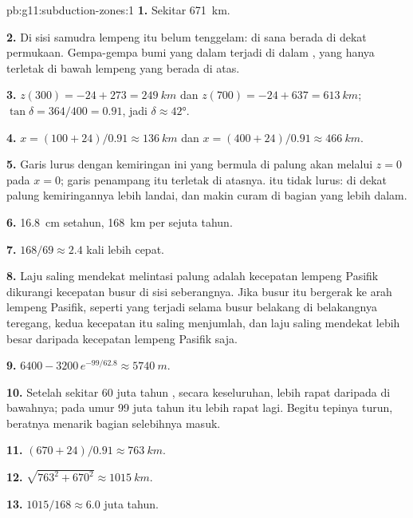 \begin{solution}{pb:g11:subduction-zones:1}
\textbf{1.} Sekitar \qty{671}{km}.

\textbf{2.} Di sisi samudra lempeng itu belum tenggelam:  di sana berada
di dekat permukaan. Gempa-gempa bumi yang dalam terjadi di dalam , yang
hanya terletak di bawah lempeng yang berada di atas.

\textbf{3.} $z(300) = -24 + 273 = \qty{249}{km}$ dan
$z(700) = -24 + 637 = \qty{613}{km}$; $\tan\delta = 364/400 = 0.91$, jadi
$\delta \approx \ang{42}$.

\textbf{4.} $x = (100 + 24)/0.91 \approx \qty{136}{km}$ dan
$x = (400 + 24)/0.91 \approx \qty{466}{km}$.

\textbf{5.} Garis lurus dengan kemiringan ini yang bermula di palung akan melalui
$z = 0$ pada $x = 0$; garis penampang itu terletak di atasnya.  itu
tidak lurus: di dekat palung kemiringannya lebih landai, dan makin curam di
bagian yang lebih dalam.

\textbf{6.} \qty{16.8}{cm} setahun, \qty{168}{km} per sejuta tahun.

\textbf{7.} $168/69 \approx 2.4$ kali lebih cepat.

\textbf{8.} Laju saling mendekat melintasi palung adalah kecepatan lempeng
Pasifik dikurangi kecepatan busur di sisi seberangnya. Jika busur itu bergerak ke
arah lempeng Pasifik, seperti yang terjadi selama busur belakang di belakangnya
teregang, kedua kecepatan itu saling menjumlah, dan laju saling mendekat lebih
besar daripada kecepatan lempeng Pasifik saja.

\textbf{9.} $6400 - 3200\,e^{-99/62.8} \approx \qty{5740}{m}$.

\textbf{10.} Setelah sekitar 60 juta tahun , secara keseluruhan,
lebih rapat daripada  di bawahnya; pada umur 99 juta tahun  itu
lebih rapat lagi. Begitu tepinya turun, beratnya menarik bagian selebihnya masuk.

\textbf{11.} $(670 + 24)/0.91 \approx \qty{763}{km}$.

\textbf{12.} $\sqrt{763^2 + 670^2} \approx \qty{1015}{km}$.

\textbf{13.} $1015/168 \approx 6.0$ juta tahun.


\end{solution}

